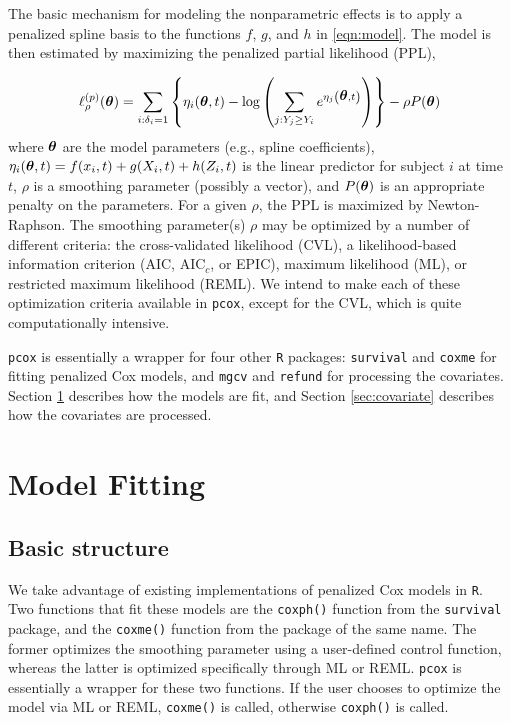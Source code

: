 \documentclass[12pt]{article}
\newcommand{\btheta}{\mbox{\boldmath $\theta$}}
\newcommand{\beq}{\begin{equation}}
\newcommand{\eeq}{\end{equation}}
\newcommand{\beqa}{\begin{eqnarray*}}
\newcommand{\eeqa}{\end{eqnarray*}}
\begin{document}
The basic mechanism for modeling the nonparametric effects is to apply a penalized spline
basis to the functions $f$, $g$, and $h$ in \eqref{eqn:model}. The model is then estimated by
maximizing the penalized partial likelihood (PPL), 

\beq
	\ell^{(p)}_{\rho}(\btheta) = \sum_{i:\delta_i=1}\left\{ \eta_i(\btheta,t) -
		\log\left(\sum_{j: Y_j\geq Y_i}e^{\eta_j\left(\btheta,t\right)}\right)\right\} - \rho P(\btheta)
\eeq
where $\btheta$ are the model parameters (e.g., spline coefficients), $\eta_i(\btheta,t) = f(x_i,t) + g(X_i,t) + h(Z_i,t)$
is the linear predictor for subject $i$ at time $t$, $\rho$ is a smoothing parameter (possibly a vector),
and $P(\btheta)$ is an appropriate penalty on the parameters. For a given $\rho$, the PPL is maximized
by Newton-Raphson. The smoothing parameter(s) $\rho$ may be optimized by a number of different criteria: 
the cross-validated likelihood (CVL), a likelihood-based information criterion (AIC, AIC$_c$, or EPIC), maximum
likelihood (ML), or restricted maximum likelihood (REML). We intend to make each of these optimization criteria
available in \texttt{pcox}, except for the CVL, which is quite computationally intensive.

\texttt{pcox} is essentially a wrapper for four other \texttt{R} packages: \texttt{survival} and \texttt{coxme} for
fitting penalized Cox models, and \texttt{mgcv} and \texttt{refund} for processing the covariates. Section
\ref{sec:fitting} describes how the models are fit, and Section \ref{sec:covariate} describes how the
covariates are processed.


\section{Model Fitting} \label{sec:fitting}

\subsection{Basic structure}

We take advantage of existing implementations of penalized Cox models in \texttt{R}. Two functions that fit these
models are the \texttt{coxph()} function from the \texttt{survival} package, and the \texttt{coxme()} function from the package
of the same name. The former optimizes the smoothing parameter using a user-defined control function, whereas
the latter is optimized specifically through ML or REML. \texttt{pcox} is essentially a wrapper for these two functions.
If the user chooses to optimize the model via ML or REML, \texttt{coxme()} is called, otherwise \texttt{coxph()} is
called.
\end{document}
